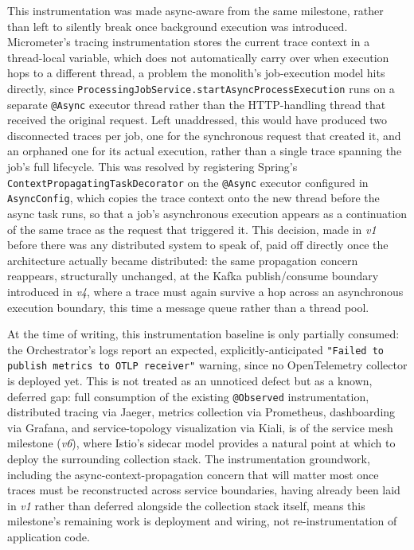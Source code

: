 \documentclass[twoside]{supsistudent}
\begin{document}
This instrumentation was made async-aware from the same milestone, rather than left to silently break once background execution was introduced. Micrometer's tracing instrumentation stores the current trace context in a thread-local variable, which does not automatically carry over when execution hops to a different thread, a problem the monolith's job-execution model hits directly, since \texttt{ProcessingJobService.startAsyncProcessExecution} runs on a separate \texttt{@Async} executor thread rather than the HTTP-handling thread that received the original request. Left unaddressed, this would have produced two disconnected traces per job, one for the synchronous request that created it, and an orphaned one for its actual execution, rather than a single trace spanning the job's full lifecycle. This was resolved by registering Spring's \texttt{ContextPropagatingTaskDecorator} on the \texttt{@Async} executor configured in \texttt{AsyncConfig}, which copies the trace context onto the new thread before the async task runs, so that a job's asynchronous execution appears as a continuation of the same trace as the request that triggered it. This decision, made in \emph{v1} before there was any distributed system to speak of, paid off directly once the architecture actually became distributed: the same propagation concern reappears, structurally unchanged, at the Kafka publish/consume boundary introduced in \emph{v4}, where a trace must again survive a hop across an asynchronous execution boundary, this time a message queue rather than a thread pool.

At the time of writing, this instrumentation baseline is only partially consumed: the Orchestrator's logs report an expected, explicitly-anticipated \texttt{"Failed to publish metrics to OTLP receiver"} warning, since no OpenTelemetry collector is deployed yet. This is not treated as an unnoticed defect but as a known, deferred gap: full consumption of the existing \texttt{@Observed} instrumentation, distributed tracing via Jaeger, metrics collection via Prometheus, dashboarding via Grafana, and service-topology visualization via Kiali, is of the service mesh milestone (\emph{v6}), where Istio's sidecar model provides a natural point at which to deploy the surrounding collection stack. The instrumentation groundwork, including the async-context-propagation concern that will matter most once traces must be reconstructed across service boundaries, having already been laid in \emph{v1} rather than deferred alongside the collection stack itself, means this milestone's remaining work is deployment and wiring, not re-instrumentation of application code.
\end{document}
